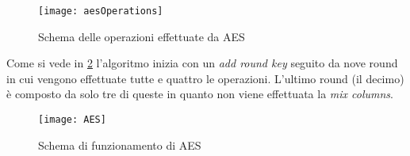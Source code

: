 				\begin{figure}
					\begin{center}
						\texttt{[image: aesOperations]}
						\caption{Schema delle operazioni effettuate da AES}
						\label{fig:operations}
					\end{center}
				\end{figure}
			
				Come si vede in \cref{fig:aes} l'algoritmo inizia con un \emph{add round key} seguito da nove round in cui vengono effettuate tutte e quattro le operazioni. L'ultimo round (il decimo) è composto da solo tre di queste in quanto non viene effettuata la \emph{mix columns}.
				
				\begin{figure}
					\begin{center}
						\texttt{[image: AES]}
						\caption{Schema di funzionamento di AES}
						\label{fig:aes}
					\end{center}
				\end{figure}
				
